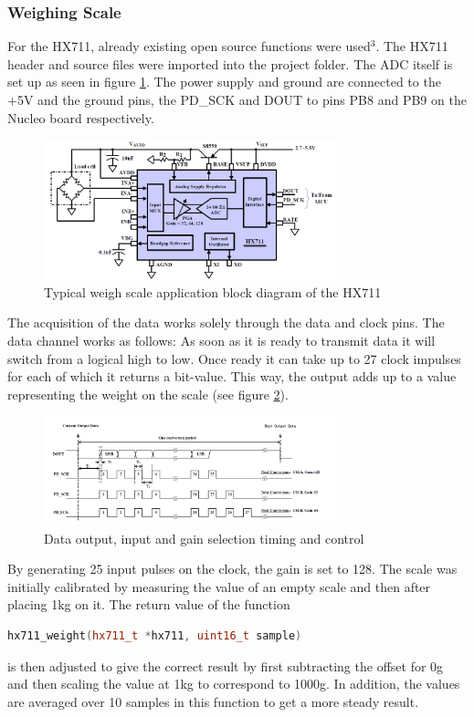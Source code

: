 \documentclass[twocolumn]{article}
\begin{document}
\begin{enumerate}
	\end{enumerate} 
	
	\subsubsection{Weighing Scale} \label{sec:weigh}
	For the HX711, already existing open source functions were used$^3$. The HX711 header and source files were imported into the project folder. The ADC itself is set up as seen in figure \ref{fig1}. The power supply and ground are connected to the +5V and the ground pins, the PD\_SCK and DOUT to pins PB8 and PB9 on the Nucleo board respectively. 
	
	\begin{figure}[H]
		\centering
		\includegraphics[width=85mm]{hx711.PNG}
		\caption{Typical weigh scale application block diagram of the HX711}
		\label{fig1}
	\end{figure}

	The acquisition of the data works solely through the data and clock pins. 
	The data channel works as follows: As soon as it is ready to transmit data it will switch from a logical high to low. Once ready it can take up to 27 clock impulses for each of which it returns a bit-value. This way, the output adds up to a value representing the weight on the scale (see figure \ref{fig2}).

	\begin{figure}[H]
	\centering
	\includegraphics[width=85mm]{hx712.PNG}
	\caption{Data output, input and gain selection timing and control}
	\label{fig2}
	\end{figure}

	\newpage
	\vspace*{40px}	
	
	By generating 25 input pulses on the clock, the gain is set to 128. 
	The scale was initially calibrated by measuring the value of an empty scale and then after placing 1kg on it. The return value of the function
	\begin{lstlisting}[language=C++]
 hx711_weight(hx711_t *hx711, uint16_t sample)
	\end{lstlisting} is then adjusted to give the correct result by first subtracting the offset for 0g and then scaling the value at 1kg to correspond to 1000g. In addition, the values are averaged over 10 samples in this function to get a more steady result.
	
\end{document}
